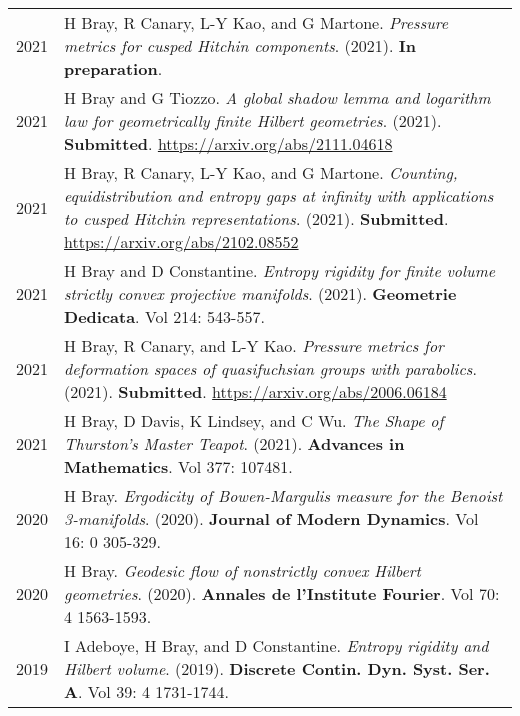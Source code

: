
    \medskip


    \medskip
    
    \begin{center}
    {
    \renewcommand{\arraystretch}{1.5}
    \begin{longtable}{p{}  p{}}
    
2021 & 
        H Bray, R Canary, L-Y Kao, and G Martone. \textit{Pressure metrics for cusped Hitchin components}. (2021). 
         \textbf{In preparation}. \\ 

2021 & 
        H Bray and G Tiozzo. \textit{A global shadow lemma and logarithm law for geometrically finite Hilbert geometries}. (2021). 
         \textbf{Submitted}. \url{https://arxiv.org/abs/2111.04618}\\ 

2021 & 
        H Bray, R Canary, L-Y Kao, and G Martone. \textit{Counting, equidistribution and entropy gaps at infinity with applications to cusped Hitchin representations}. (2021). 
         \textbf{Submitted}. \url{https://arxiv.org/abs/2102.08552}\\ 

2021 & 
        H Bray and D Constantine. \textit{Entropy rigidity for finite volume strictly convex projective manifolds}. (2021). 
        \textbf{Geometrie Dedicata}. Vol 214:  543-557.\\ 

2021 & 
        H Bray, R Canary, and L-Y Kao. \textit{Pressure metrics for deformation spaces of quasifuchsian groups with parabolics}. (2021). 
         \textbf{Submitted}. \url{https://arxiv.org/abs/2006.06184}\\ 

2021 & 
        H Bray, D Davis, K Lindsey, and C Wu. \textit{The Shape of Thurston's Master Teapot}. (2021). 
        \textbf{Advances in Mathematics}. Vol 377: 107481.\\ 

2020 & 
        H Bray. \textit{Ergodicity of Bowen-Margulis measure for the Benoist 3-manifolds}. (2020). 
        \textbf{Journal of Modern Dynamics}. Vol 16: 0 305-329.\\ 

2020 & 
        H Bray. \textit{Geodesic flow of nonstrictly convex Hilbert geometries}. (2020). 
        \textbf{Annales de l'Institute Fourier}. Vol 70: 4 1563-1593.\\ 

2019 & 
        I Adeboye, H Bray, and D Constantine. \textit{Entropy rigidity and Hilbert volume}. (2019). 
        \textbf{Discrete Contin. Dyn. Syst. Ser. A}. Vol 39: 4 1731-1744.
    \end{longtable}
    } 
    \end{center}

    \vspace{-1em}
    